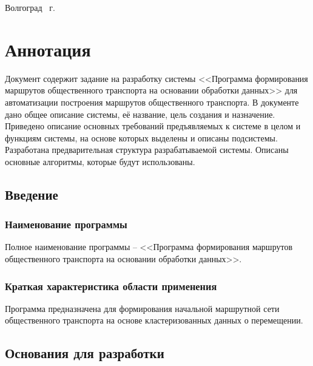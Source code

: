 \vspace{\fill}
\begin{center}
    Волгоград \the\year\ г.
\end{center}
\newpage

\tocless\part{Аннотация}
Документ содержит задание на разработку системы <<Программа формирования маршрутов общественного транспорта 
на основании обработки данных>> для автоматизации построения маршрутов общественного транспорта. В документе 
дано общее описание системы, её название, цель создания и назначение. Приведено описание основных требований 
предъявляемых к системе в целом и функциям системы, на основе которых выделены и описаны подсистемы. 
Разработана предварительная структура разрабатываемой системы. Описаны основные алгоритмы, которые будут 
использованы.
\newpage

\startcontents[sections]

% 
%

\chapter{Введение}
\section{Наименование программы}
Полное наименование программы -- <<Программа формирования маршрутов 
общественного транспорта на основании обработки данных>>.

\section{Краткая характеристика области применения}
Программа предназначена для формирования начальной маршрутной сети общественного транспорта на основе 
кластеризованных данных о перемещении.

\chapter{Основания для разработки}
